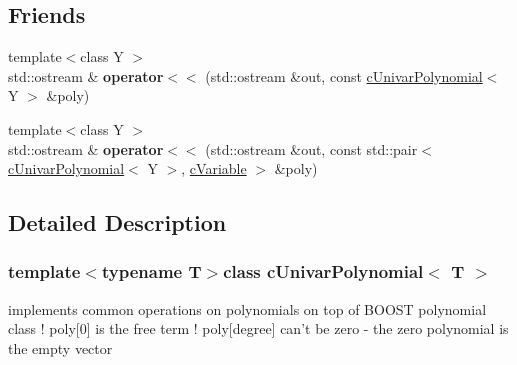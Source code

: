 \subsection*{Friends}
\begin{DoxyCompactItemize}
\item 
\hypertarget{classcUnivarPolynomial_ad225ad139a5ce7b6a4cb685a219ed9ab}{{\footnotesize template$<$class Y $>$ }\\std\-::ostream \& {\bfseries operator$<$$<$} (std\-::ostream \&out, const \hyperlink{classcUnivarPolynomial}{c\-Univar\-Polynomial}$<$ Y $>$ \&poly)}\label{classcUnivarPolynomial_ad225ad139a5ce7b6a4cb685a219ed9ab}

\item 
\hypertarget{classcUnivarPolynomial_a92998d9dc30249d38f164dc4ebc8abef}{{\footnotesize template$<$class Y $>$ }\\std\-::ostream \& {\bfseries operator$<$$<$} (std\-::ostream \&out, const std\-::pair$<$ \hyperlink{classcUnivarPolynomial}{c\-Univar\-Polynomial}$<$ Y $>$, \hyperlink{classcVariable}{c\-Variable} $>$ \&poly)}\label{classcUnivarPolynomial_a92998d9dc30249d38f164dc4ebc8abef}

\end{DoxyCompactItemize}


\subsection{Detailed Description}
\subsubsection*{template$<$typename T$>$class c\-Univar\-Polynomial$<$ T $>$}

implements common operations on polynomials on top of B\-O\-O\-S\-T polynomial class ! poly\mbox{[}0\mbox{]} is the free term ! poly\mbox{[}degree\mbox{]} can't be zero -\/ the zero polynomial is the empty vector 

